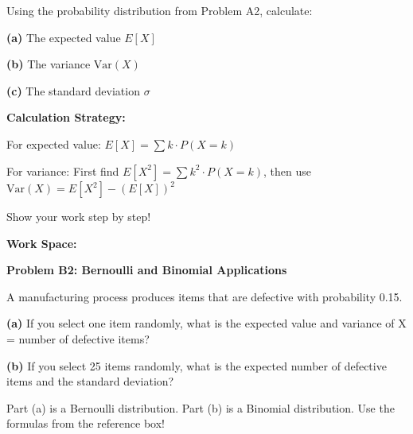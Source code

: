 \documentclass[
  11pt,
]{article}
\begin{document}
Using the probability distribution from Problem A2, calculate:

\textbf{(a)} The expected value \(E[X]\)

\textbf{(b)} The variance \(\text{Var}(X)\)

\textbf{(c)} The standard deviation \(\sigma\)

\begin{tcolorbox}[enhanced jigsaw, coltitle=black, colback=white, titlerule=0mm, left=2mm, opacityback=0, bottomtitle=1mm, title=\textcolor{quarto-callout-tip-color}{\faLightbulb}\hspace{0.5em}{Tip}, colframe=quarto-callout-tip-color-frame, toptitle=1mm, arc=.35mm, leftrule=.75mm, toprule=.15mm, bottomrule=.15mm, breakable, rightrule=.15mm, colbacktitle=quarto-callout-tip-color!10!white, opacitybacktitle=0.6]

\textbf{Calculation Strategy:}

For expected value: \(E[X] = \sum k \cdot P(X = k)\)

For variance: First find \(E[X^2] = \sum k^2 \cdot P(X = k)\), then use
\(\text{Var}(X) = E[X^2] - (E[X])^2\)

Show your work step by step!

\end{tcolorbox}

\textbf{Work Space:}

\textbf{Problem B2: Bernoulli and Binomial Applications}

A manufacturing process produces items that are defective with
probability 0.15.

\textbf{(a)} If you select one item randomly, what is the expected value
and variance of X = number of defective items?

\textbf{(b)} If you select 25 items randomly, what is the expected
number of defective items and the standard deviation?

\begin{tcolorbox}[enhanced jigsaw, coltitle=black, colback=white, titlerule=0mm, left=2mm, opacityback=0, bottomtitle=1mm, title=\textcolor{quarto-callout-tip-color}{\faLightbulb}\hspace{0.5em}{Tip}, colframe=quarto-callout-tip-color-frame, toptitle=1mm, arc=.35mm, leftrule=.75mm, toprule=.15mm, bottomrule=.15mm, breakable, rightrule=.15mm, colbacktitle=quarto-callout-tip-color!10!white, opacitybacktitle=0.6]

Part (a) is a Bernoulli distribution. Part (b) is a Binomial
distribution. Use the formulas from the reference box!

\end{tcolorbox}
\end{document}

